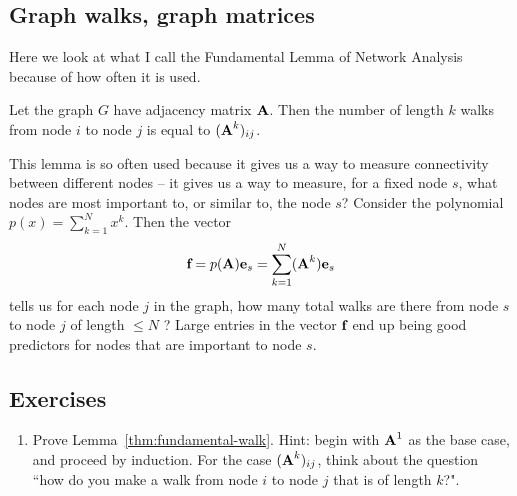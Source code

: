 \subsection{Graph walks, graph matrices}\label{sec:fundamentals:walks}


Here we look at what I call the Fundamental Lemma of Network Analysis because of how often it is used.
\begin{lemma}\label{thm:fundamental-walk}
Let the graph $G$ have adjacency matrix $\textbf{A}$. Then the number of length $k$ walks from node $i$ to node $j$ is equal to $(\textbf{A}^k)_{ij}$.
\end{lemma}

This lemma is so often used because it gives us a way to measure connectivity between different nodes -- it gives us a way to measure, for a fixed node $s$, what nodes are most important to, or similar to, the node $s$?
Consider the polynomial $p(x) = \sum_{k=1}^N x^k$. Then the vector
\[
\textbf{f} =  p(\textbf{A})\textbf{e}_s = \sum_{k=1}^N (\textbf{A}^k)\textbf{e}_s
\]
tells us for each node $j$ in the graph, how many total walks are there from node $s$ to node $j$ of length $\leq N$ ?
Large entries in the vector $\textbf{f}$ end up being good predictors for nodes that are important to node $s$.






\subsection{Exercises}

\begin{enumerate}[label=\ref{sec:fundamentals}.\arabic*]
\item Prove Lemma~\ref{thm:fundamental-walk}. Hint: begin with $\textbf{A}^1$ as the base case, and proceed by induction. For the case $(\textbf{A}^k)_{ij}$, think about the question ``how do you make a walk from node $i$ to node $j$ that is of length $k$?".

\end{enumerate}

